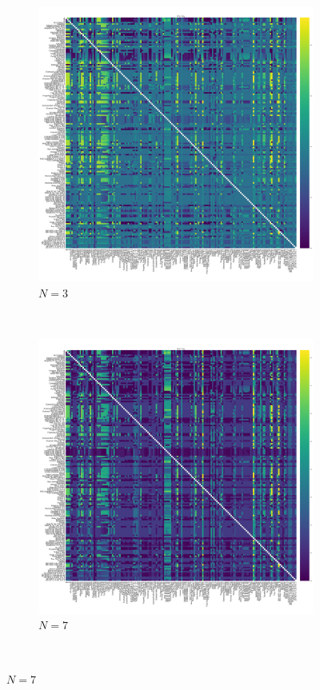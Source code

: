 \documentclass{article}
\begin{document}
\begin{figure}[!hbtp]
    \centering
    \begin{subfigure}[t]{.3\textwidth}
        \centering
        \includegraphics[width=.8\textwidth]{./img/fixation_heatmap_3_invade.pdf}
        \caption{\(N=3\)}
    \end{subfigure}%
    ~
    \begin{subfigure}[t]{.3\textwidth}
        \centering
        \includegraphics[width=.8\textwidth]{./img/fixation_heatmap_7_invade.pdf}
        \caption{\(N=7\)}
    \end{subfigure}%
    ~

\end{figure}
\end{document}
